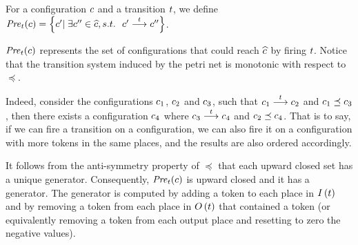 \label{section:backwardreachability}

For a configuration $c$ and a transition $t$, we
define ${\it Pre}_t(c)=\left\{c'|\;\exists c''\in\widehat{c},
  s.t.\ \ c'\stackrel{t}{\longrightarrow}c''\right\}$.  

\noindent%
\begin{minipage}{0.4\linewidth}
\end{minipage}
\hfill%
\begin{minipage}{0.59\linewidth}
  ${\it Pre}_t(c)$ represents the set of configurations that could
  reach $\widehat{c}$ by firing $t$.
  Notice that the transition system induced by the petri net is
  monotonic with respect to $\preceq$.
\end{minipage}

\noindent%
Indeed, consider the configurations $c_1$, $c_2$ and
$c_3$, such that $c_1\stackrel{t}{\longrightarrow}c_2$ and
$c_1\preceq c_3$, then there exists a configuration $c_4$
where $c_3\stackrel{t}{\longrightarrow}c_4$ and $c_2\preceq c_4$. That is
to say, if we can fire a transition on a configuration, we can also
fire it on a configuration with more tokens in the same places, and
the results are also ordered accordingly.

It follows from the anti-symmetry property of $\preceq$ that each
upward closed set has a unique generator.
%
Consequently, ${\it Pre}_t(c)$ is upward closed and it has a generator.
The generator is computed by adding a token to each place in
$I\left(t\right)$ and by removing a token from each place in
$O\left(t\right)$ that contained a token (or equivalently removing a
token from each output place and resetting to zero the negative
values).


